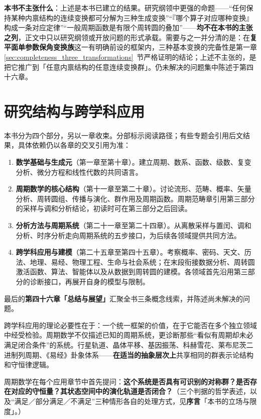 \textbf{本书不主张什么}：上述是本书已建立的结果。研究纲领中更强的命题——“任何保持某种内禀结构的连续变换都可分解为三种生成变换”“『哪个算子对应哪种变换』构成一条对应定律”“一般周期函数是有限个周转圆的叠加”——\textbf{均不在本书的主张之列}，正文中只以研究纲领或开放问题的形式承载。需要与之一并分清的是：在\textbf{复平面单参数保角变换族}这一有明确前设的框架内，三种基本变换的完备性是第一章\cref{sec:completeness_three_transformations}~节严格证明的结论；上述不主张的，是把它推广到「任意内禀结构的任意连续变换群」。仍未解决的问题集中陈述于第四十六章。

\section*{研究结构与跨学科应用}

本书分为四个部分，另以一章收束。分部标示阅读路径；有些专题会引用后文结果，具体依赖仍以各章的交叉引用为准：
\begin{enumerate}[leftmargin=6em, label={\textbf{第 \arabic* 部分}}]
    \item \textbf{数学基础与生成元}（第一章至第十章）。建立周期、数系、函数、级数、复变分析、微分方程和线性代数的共同语言。
    \item \textbf{周期数学的核心结构}（第十一章至第二十章）。讨论流形、范畴、概率、矢量分析、周转圆组、传播与演化、群作用及周期函数。周期范畴章引用第三部分的采样与调和分析结论，初读时可在第三部分之后回读。
    \item \textbf{分析方法与周期系统}（第二十一章至第二十四章）。从离散采样与置闰、调和分析、时序分析走向周期系统的五步接口，为后续各领域提供共同方法。
    \item \textbf{跨学科应用与建模}（第二十五章至第四十五章）。考察概率、密码、天文、历法、地理、易经、物理工程、生命与社会系统；在末段衔接数据分析、周转圆激活函数、算法、智能体以及从数据到周转圆的建模。各领域首先沿用第三部分的诊断接口，再展开自身的模型与限制。
\end{enumerate}
最后的\textbf{第四十六章「总结与展望」}汇聚全书三条概念线索，并陈述尚未解决的问题。

跨学科应用的理论必要性在于：一个统一框架的价值，在于它能否在多个独立领域中经受检验。周期数学不仅描述已知的周期系统，更诊断那些“看似有周期却未必满足闭合条件”的系统。行星轨道、晶体平移、基因振荡、科赫雪花、莱布尼茨二进制列周期、《易经》卦象体系——\textbf{在适当的抽象层次上}共享相同的群表示论结构和守恒律逻辑。

周期数学在每个应用章节中首先提问：\textbf{这个系统是否具有可识别的对称群？是否存在对应的守恒量？其状态空间中的演化轨道是否闭合？}（三个判据的哲学表述，以及“满足／部分满足／不满足”三种情形各自的处理方式，见\textbf{序言}「本书的立场与限度」。）

